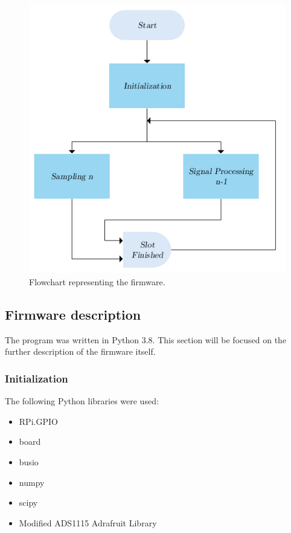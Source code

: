 \documentclass[twoside, twocolumn, spanish] {article}
\begin{document}
\begin{figure}[!h]
\centering
\includegraphics[width=\columnwidth]{imag/flowchart_general}
\caption{Flowchart representing the firmware.}  \label{flowchart_general}
\end{figure}

\subsection{Firmware description}
The program was written in Python 3.8. This section will be focused on the further description of the firmware itself.

\subsubsection{Initialization}
The following Python libraries were used:
\begin{itemize}
\item RPi.GPIO
\item board
\item busio
\item numpy
\item scipy
\item Modified ADS1115 Adrafruit Library
\end{itemize}
\end{document}
